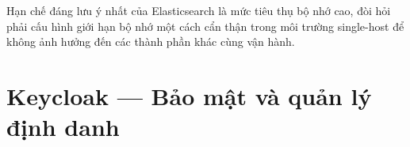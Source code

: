 \documentclass[../DoAn.tex]{subfiles}
\begin{document}
Hạn chế đáng lưu ý nhất của Elasticsearch là mức tiêu thụ bộ nhớ cao, đòi hỏi phải cấu hình
giới hạn bộ nhớ một cách cẩn thận trong môi trường single-host để không ảnh hưởng đến các
thành phần khác cùng vận hành.





\section{Keycloak --- Bảo mật và quản lý định danh}
\label{section:3.5}
\end{document}

